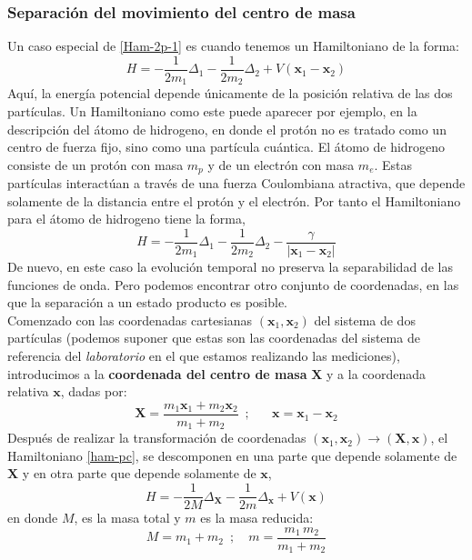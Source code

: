 \documentclass[12pt]{book}
\numberwithin{equation}{chapter}
\def\rar{\rightarrow}
\def\x{\mathbf{x}}
\def\xx{\mathbf{X}}
\begin{document}
\subsubsection{Separaci\'on del movimiento del centro de masa}
Un caso especial de \eqref{Ham-2p-1} es cuando tenemos un Hamiltoniano de la forma:
\begin{equation}\label{ham-pc}
H= - \frac{1}{2m_{1}} \Delta_{1} - \frac{1}{2m_{2}} \Delta_{2} + V(\x_{1} - \x_{2})
\end{equation}
Aqu\'i, la energ\'ia potencial depende \'unicamente de la posici\'on relativa de las dos part\'iculas. Un Hamiltoniano como este puede aparecer por ejemplo, en la descripci\'on del \'atomo de hidrogeno, en donde el prot\'on no es tratado como un centro de fuerza fijo, sino como una part\'icula cu\'antica. El \'atomo de hidrogeno consiste de un prot\'on con masa $m_{p}$ y de un electr\'on con masa $m_{e}$. Estas part\'iculas interact\'uan a trav\'es de una fuerza Coulombiana atractiva, que depende solamente de la distancia entre el prot\'on y el electr\'on. Por tanto el Hamiltoniano para el \'atomo de hidrogeno tiene la forma,
$$ H= - \frac{1}{2m_{1}} \Delta_{1} - \frac{1}{2m_{2}} \Delta_{2} - \frac{\gamma}{|\x_{1} - \x_{2} |} $$
De nuevo, en este caso la evoluci\'on temporal no preserva la separabilidad de las funciones de onda. Pero podemos encontrar otro conjunto de coordenadas, en las que la separaci\'on a un estado producto es posible. \\
Comenzado con las coordenadas cartesianas $ (\x_{1} , \x_{2}) $ del sistema de dos part\'iculas (podemos suponer que estas son las coordenadas del sistema de referencia del \emph{laboratorio} en el que estamos realizando las mediciones), introducimos a la {\bf coordenada del centro de masa} $\xx$ y a la coordenada relativa $\x$, dadas por:
\begin{equation}\label{cm-cr}
\xx = \frac{ m_{1}\x_{1} + m_{2}\x_{2} }{m_{1}+m_{2}} \,\,\,;\,\,\,\,\,\,\,\,\,\, \x= \x_{1} - \x_{2}
\end{equation}
Despu\'es de realizar la transformaci\'on de coordenadas $ (\x_{1} , \x_{2}) \rar ( \xx , \x ) $, el Hamiltoniano \eqref{ham-pc}, se descomponen en una parte que depende solamente de $\xx$ y en otra parte que depende solamente de $\x$,
\begin{equation}\label{Ham-2p}
H= -\frac{1}{2M} \Delta_{\xx} - \frac{1}{2 m} \Delta_{\x} + V(\x)
\end{equation}
en donde $M$, es la masa total y $m$ es la masa reducida:
\begin{equation}\label{Mt-mr}
M=m_{1}+m_{2} \,\,\,;\,\,\,\,\,\, m = \frac{m_{1}\, m_{2}}{ m_{1} + m_{2} }
\end{equation} 
\end{document}
